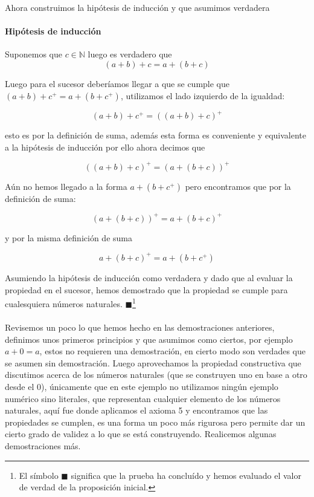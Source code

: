 \documentclass{article}
\begin{document}
Ahora construimos la hipótesis de inducción y que asumimos verdadera
\paragraph{Hipótesis de inducción} Suponemos que $c \in \mathbb{N}$ luego es verdadero que 
$$(a + b) + c = a + (b + c)$$

Luego para el sucesor deberíamos llegar a que se cumple que $(a + b) + c^+ = a + (b + c^+)$, utilizamos el lado izquierdo de la igualdad:

    $$(a + b) + c^+ = ((a + b) + c)^+$$

esto es por la definición de suma, además esta forma es conveniente y equivalente a la hipótesis de inducción por ello ahora decimos que

$$((a + b) + c)^+ = (a + (b + c))^+$$

Aún no hemos llegado a la forma $a + (b + c^+)$ pero encontramos que por la definición de suma:

$$(a + (b + c))^+ = a + (b + c)^+$$

y por la misma definición de suma

$$a + (b + c)^+ = a + (b + c^+)$$

Asumiendo la hipótesis de inducción como verdadera y dado que al evaluar la propiedad en el sucesor, hemos demostrado que la propiedad se cumple para cualesquiera números naturales. $\blacksquare$\footnote{El símbolo $\blacksquare$ significa que la prueba ha concluído y hemos evaluado el valor de verdad de la proposición inicial.}

\paragraph{} Revisemos un poco lo que hemos hecho en las demostraciones anteriores, definimos unos primeros principios y que asumimos como ciertos, por ejemplo $a + 0 = a$, estos no requieren una demostración, en cierto modo son verdades que se asumen sin demostración. Luego aprovechamos la propiedad constructiva que discutimos acerca de los números naturales (que se construyen uno en base a otro desde el 0), únicamente que en este ejemplo no utilizamos ningún ejemplo numérico sino literales, que representan cualquier elemento de los números naturales, aquí fue donde aplicamos el axioma 5 y encontramos que las propiedades se cumplen, es una forma un poco más rigurosa pero permite dar un cierto grado de validez a lo que se está construyendo. Realicemos algunas demostraciones más.
\end{document}
